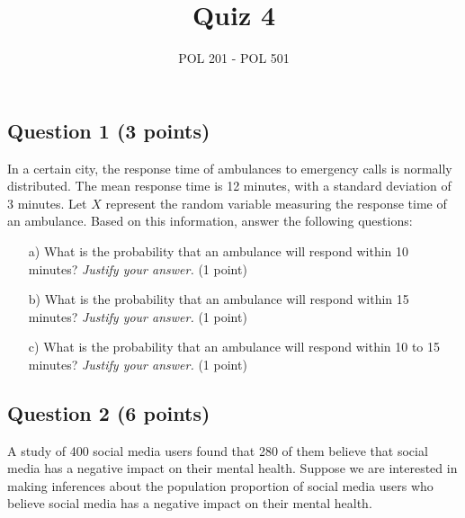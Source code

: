 \documentclass{article}
\title{Quiz 4}
\author{POL 201 - POL 501}
\date{}
\begin{document}
\maketitle

\subsection*{Question 1 (3 points)}
In a certain city, the response time of ambulances to emergency calls is normally distributed. The mean response time is 12 minutes, with a standard deviation of 3 minutes. Let \(X\) represent the random variable measuring the response time of an ambulance. \newline 
Based on this information, answer the following questions:

\begin{enumerate}
\item[a)] What is the probability that an ambulance will respond within 10 minutes? \emph{Justify your answer.} (1 point)
\begin{center}
\end{center}

\item[b)] What is the probability that an ambulance will respond within 15 minutes? \emph{Justify your answer.} (1 point)
\begin{center}
\end{center}

\item[c)] What is the probability that an ambulance will respond within 10 to 15 minutes? \emph{Justify your answer.} (1 point)

\begin{center}
\end{center}

\end{enumerate}

\subsection*{Question 2 (6 points)}
A study of 400 social media users found that 280 of them believe that social media has a negative impact on their mental health. Suppose we are interested in making inferences about the population proportion of social media users who believe social media has a negative impact on their mental health. 
\end{document}
